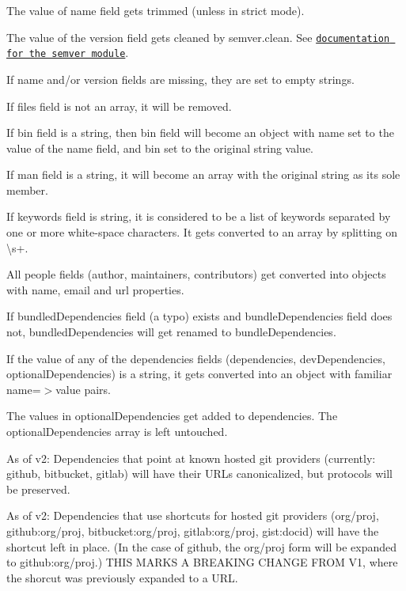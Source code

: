 \begin{DoxyItemize}
\item The value of {\ttfamily name} field gets trimmed (unless in strict mode).
\item The value of the {\ttfamily version} field gets cleaned by {\ttfamily semver.\+clean}. See \href{https://github.com/isaacs/node-semver}{\tt documentation for the semver module}.
\item If {\ttfamily name} and/or {\ttfamily version} fields are missing, they are set to empty strings.
\item If {\ttfamily files} field is not an array, it will be removed.
\item If {\ttfamily bin} field is a string, then {\ttfamily bin} field will become an object with {\ttfamily name} set to the value of the {\ttfamily name} field, and {\ttfamily bin} set to the original string value.
\item If {\ttfamily man} field is a string, it will become an array with the original string as its sole member.
\item If {\ttfamily keywords} field is string, it is considered to be a list of keywords separated by one or more white-\/space characters. It gets converted to an array by splitting on {\ttfamily \textbackslash{}s+}.
\item All people fields ({\ttfamily author}, {\ttfamily maintainers}, {\ttfamily contributors}) get converted into objects with name, email and url properties.
\item If {\ttfamily bundled\+Dependencies} field (a typo) exists and {\ttfamily bundle\+Dependencies} field does not, {\ttfamily bundled\+Dependencies} will get renamed to {\ttfamily bundle\+Dependencies}.
\item If the value of any of the dependencies fields ({\ttfamily dependencies}, {\ttfamily dev\+Dependencies}, {\ttfamily optional\+Dependencies}) is a string, it gets converted into an object with familiar {\ttfamily name=$>$value} pairs.
\item The values in {\ttfamily optional\+Dependencies} get added to {\ttfamily dependencies}. The {\ttfamily optional\+Dependencies} array is left untouched.
\item As of v2\+: Dependencies that point at known hosted git providers (currently\+: github, bitbucket, gitlab) will have their U\+R\+Ls canonicalized, but protocols will be preserved.
\item As of v2\+: Dependencies that use shortcuts for hosted git providers ({\ttfamily org/proj}, {\ttfamily github\+:org/proj}, {\ttfamily bitbucket\+:org/proj}, {\ttfamily gitlab\+:org/proj}, {\ttfamily gist\+:docid}) will have the shortcut left in place. (In the case of github, the {\ttfamily org/proj} form will be expanded to {\ttfamily github\+:org/proj}.) T\+H\+IS M\+A\+R\+KS A B\+R\+E\+A\+K\+I\+NG C\+H\+A\+N\+GE F\+R\+OM V1, where the shorcut was previously expanded to a U\+RL.

\end{DoxyItemize}
